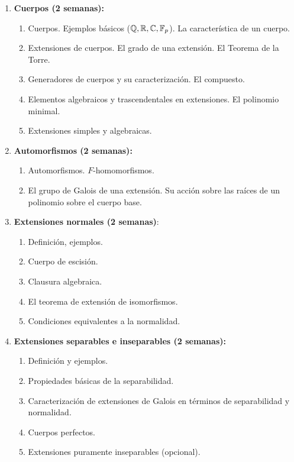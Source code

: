 \begin{refsection}
\begin{enumerate}
\item \textbf{Cuerpos (2 semanas):} 
\begin{enumerate}
    \item Cuerpos. Ejemplos básicos ($\mathbb{Q}, \mathbb{R}, \mathbb{C}, \mathbb{F}_p$). La característica de un cuerpo.
    \item Extensiones de cuerpos. El grado de una extensión. El Teorema de la Torre.
    \item Generadores de cuerpos y su caracterización. El compuesto.
    \item Elementos algebraicos y trascendentales en extensiones. El polinomio minimal.
    \item Extensiones simples y algebraicas.
\end{enumerate}

\item \textbf{Automorfismos (2 semanas):} 
\begin{enumerate}
    \item Automorfismos. $F$-homomorfismos.
    \item El grupo de Galois de una extensión. Su acción sobre las raíces de un polinomio sobre el cuerpo base.
\end{enumerate}

\item \textbf{Extensiones normales (2 semanas)}:
\begin{enumerate}
    \item Definición, ejemplos. 
    \item Cuerpo de escisión. 
    \item Clausura algebraica. 
    \item El teorema de extensión de isomorfismos. 
    \item Condiciones equivalentes a la normalidad. 
\end{enumerate}

\item \textbf{Extensiones separables e inseparables (2 semanas):}
\begin{enumerate}
    \item Definición y ejemplos. 
    \item Propiedades básicas de la separabilidad. 
 \item Caracterización de extensiones de Galois en términos de separabilidad y normalidad. 
 \item Cuerpos perfectos. 
 \item Extensiones puramente inseparables (opcional). 
\end{enumerate}


\end{enumerate}
\end{refsection}
